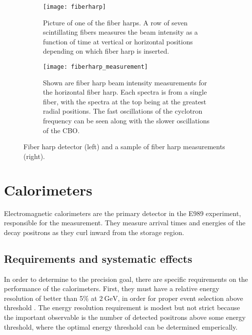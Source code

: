 \begin{figure}[]
\centering
    \begin{subfigure}[]{0.45\textwidth}
        \centering
        \vspace{-11mm}
        \texttt{[image: fiberharp]}
        \vspace{2mm}
        \caption{Picture of one of the fiber harps. A row of seven scintillating fibers measures the beam intensity as a function of time at vertical or horizontal positions depending on which fiber harp is inserted.}
    \label{fig:fiberharp}
    \end{subfigure}%
    \hspace{10mm}
    \begin{subfigure}[]{0.45\textwidth}
        \centering
        \texttt{[image: fiberharp\_measurement]}
        \vspace{-3mm}
        \caption{Shown are fiber harp beam intensity measurements for the horizontal fiber harp. Each spectra is from a single fiber, with the spectra at the top being at the greatest radial positions. The fast oscillations of the cyclotron frequency can be seen along with the slower oscillations of the CBO.}
    \label{fig:fiberharp_measurement}
    \end{subfigure}
\caption[Fiber harp and measurement]{Fiber harp detector (left) and a sample of fiber harp measurements (right).}
\label{fig:fiberharppics}
\end{figure}





\section{Calorimeters}
\label{sec:Calorimeters}


Electromagnetic calorimeters are the primary detector in the E989 experiment, responsible for the \wa measurement. They measure arrival times and energies of the decay positrons as they curl inward from the storage region. 

\subsection{Requirements and systematic effects}
\label{sub:calosystematics}

In order to determine \wa to the precision goal, there are specific requirements on the performance of the calorimeters. First, they must have a relative energy resolution of better than 5\% at $\SI{2}{\GeV}$, in order for proper event selection above threshold \cite{TDR}. The energy resolution requirement is modest but not strict because the important observable is the number of detected positrons above some energy threshold, where the optimal energy threshold can be determined emperically.

